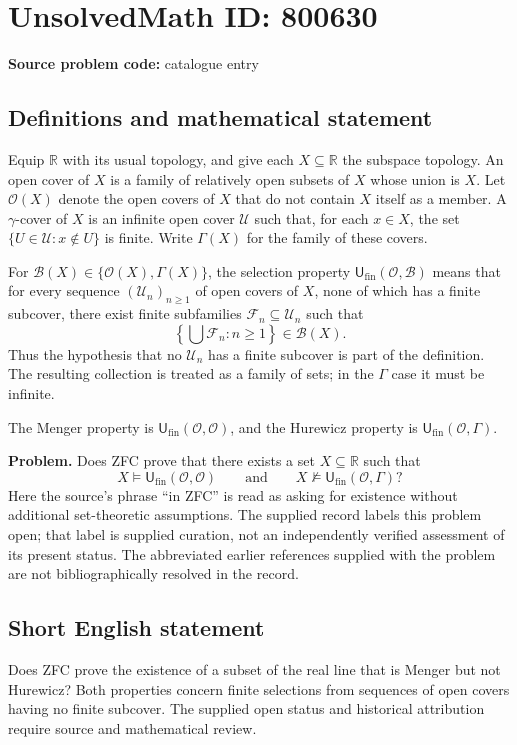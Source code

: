 \documentclass[11pt]{article}
\newcommand{\R}{\mathbb{R}}
\begin{document}
\section*{UnsolvedMath ID: 800630}
\textbf{Source problem code:} catalogue entry
\subsection{Definitions and mathematical statement}
Equip \(\R\) with its usual topology, and give each \(X\subseteq\R\) the subspace topology. An open cover of \(X\) is a family of relatively open subsets of \(X\) whose union is \(X\). Let \(\mathcal O(X)\) denote the open covers of \(X\) that do not contain \(X\) itself as a member. A \(\gamma\)-cover of \(X\) is an infinite open cover \(\mathcal U\) such that, for each \(x\in X\), the set \(\{U\in\mathcal U:x\notin U\}\) is finite. Write \(\Gamma(X)\) for the family of these covers.

For \(\mathcal B(X)\in\{\mathcal O(X),\Gamma(X)\}\), the selection property \(\mathsf U_{\mathrm{fin}}(\mathcal O,\mathcal B)\) means that for every sequence \((\mathcal U_n)_{n\geq1}\) of open covers of \(X\), none of which has a finite subcover, there exist finite subfamilies \(\mathcal F_n\subseteq\mathcal U_n\) such that
\[
\left\{\bigcup\mathcal F_n:n\geq1\right\}\in\mathcal B(X).
\]
Thus the hypothesis that no \(\mathcal U_n\) has a finite subcover is part of the definition. The resulting collection is treated as a family of sets; in the \(\Gamma\) case it must be infinite.

The Menger property is \(\mathsf U_{\mathrm{fin}}(\mathcal O,\mathcal O)\), and the Hurewicz property is \(\mathsf U_{\mathrm{fin}}(\mathcal O,\Gamma)\).

\textbf{Problem.} Does ZFC prove that there exists a set \(X\subseteq\R\) such that
\[
X\models\mathsf U_{\mathrm{fin}}(\mathcal O,\mathcal O)
\qquad\text{and}\qquad
X\not\models\mathsf U_{\mathrm{fin}}(\mathcal O,\Gamma)?
\]
Here the source's phrase ``in ZFC'' is read as asking for existence without additional set-theoretic assumptions. The supplied record labels this problem open; that label is supplied curation, not an independently verified assessment of its present status. The abbreviated earlier references supplied with the problem are not bibliographically resolved in the record.
\subsection{Short English statement}
Does ZFC prove the existence of a subset of the real line that is Menger but not Hurewicz? Both properties concern finite selections from sequences of open covers having no finite subcover. The supplied open status and historical attribution require source and mathematical review.
\end{document}
